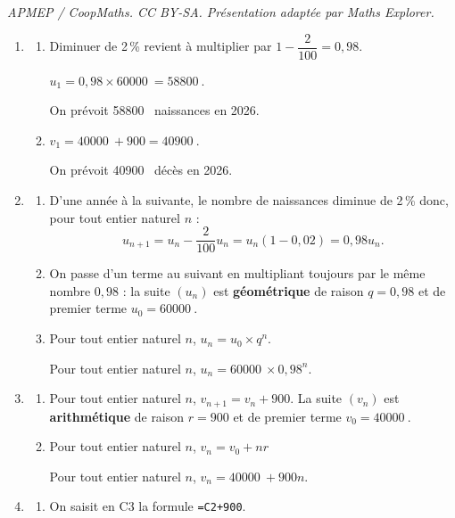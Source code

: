 \documentclass[10pt]{article}
\providecommand{\np}[2][]{{#2~#1}}
\begin{document}
\noindent\textit{APMEP / CoopMaths. CC BY-SA. Présentation adaptée par Maths Explorer.}\par\medskip
\begin{enumerate}
	\item
	\begin{enumerate}
		\item Diminuer de 2\,\% revient à multiplier par $1 - \dfrac{2}{100} = 0,98$.
		
		$u_1 = 0,98 \times \np{60000} = \np{58800}$.

		On prévoit \np{58800} naissances en 2026.

		\item $v_1 = \np{40000} + 900 = \np{40900}$.

		On prévoit \np{40900} décès en 2026.
	\end{enumerate}

	\item
	\begin{enumerate}
		\item D'une année à la suivante, le nombre de naissances diminue de 2\,\% donc, pour tout entier naturel $n$ :
		\[u_{n+1} = u_n - \dfrac{2}{100}u_n = u_n(1 - 0,02) = 0,98u_n.\]

		\item On passe d'un terme au suivant en multipliant toujours par le même nombre $0,98$ : la suite
		$(u_n)$ est \textbf{géométrique} de raison $q = 0,98$ et de premier terme $u_0 = \np{60000}$.

		\item Pour tout entier naturel $n$, $u_n = u_0 \times q^n$.
		
		 Pour tout entier naturel $n$, $u_n = \np{60000} \times 0,98^n$.
	\end{enumerate}

	\item
	\begin{enumerate}
		\item Pour tout entier naturel $n$, $v_{n+1} = v_n + 900$. La suite $(v_n)$
		est \textbf{arithmétique} de raison $r = 900$ et de premier terme $v_0 = \np{40000}$.

		\item Pour tout entier naturel $n$,  $v_n = v_0 + nr$
		
		Pour tout entier naturel $n$, $v_n = \np{40000} + 900n$.
	\end{enumerate}

	\item
	\begin{enumerate}
		\item On saisit en C3 la formule \texttt{=C2+900}.


\end{enumerate}
\end{enumerate}
\end{document}
